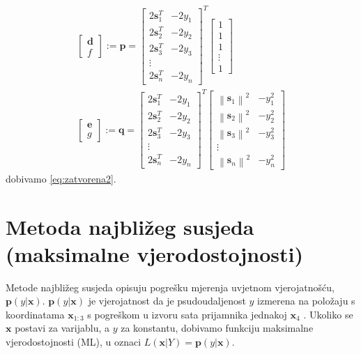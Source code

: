 \documentclass[a4paper,twoside,12pt]{memoir} %
\begin{document}
\begin{align}
	\begin{bmatrix}
	\mathbf{d} \\
	f
	\end{bmatrix}:=
	\mathbf{p} = \begin{bmatrix}
	2\mathbf{s}_1^T & -2y_1\\
	2\mathbf{s}_2^T & -2y_2 \\
	2\mathbf{s}_3^T & -2y_3\\
	\vdots \\
	2\mathbf{s}_n^T & -2y_n
	\end{bmatrix}^T 
	\begin{bmatrix}
	1 \\
	1 \\
	1 \\
	\vdots \\
	1 
	\end{bmatrix} 
	\\ 
	\begin{bmatrix}
	\mathbf{e} \\
	g
	\end{bmatrix}:=
	\mathbf{q} = \begin{bmatrix}
	2\mathbf{s}_1^T & -2y_1\\
	2\mathbf{s}_2^T & -2y_2 \\
	2\mathbf{s}_3^T & -2y_3\\
	\vdots \\
	2\mathbf{s}_n^T & -2y_n
	\end{bmatrix}^T
	\begin{bmatrix}
	\left \| \mathbf{s}_1\right \|^2 & -y_1^2\\
	\left \| \mathbf{s}_2\right \|^2 & -y_2^2\\
	\left \| \mathbf{s}_3\right \|^2 & -y_3^2\\
	\vdots \\
	\left \| \mathbf{s}_n\right \|^2 & -y_n^2
	\end{bmatrix}
\end{align}
dobivamo \ref{eq:zatvorena2}.

\section{Metoda najbližeg susjeda (maksimalne vjerodostojnosti)}\label{sec:MLE}
Metode najbližeg susjeda opisuju pogrešku mjerenja uvjetnom vjerojatnošću,
$\mathbf{p}(y|\mathbf{x})$.
$\mathbf{p}(y|\mathbf{x})$ je vjerojatnost da je psudoudaljenost $y$ izmerena na položaju
s koordinatama $\mathbf{x}_{1:3}$ s pogreškom u izvoru sata prijamnika jednakoj $\mathbf{x}_4$ \cite{math:positioning}.
Ukoliko se $\mathbf{x}$ postavi za varijablu, a $y$ za konstantu, dobivamo
funkciju maksimalne vjerodostojnosti (ML), u oznaci
$L(\mathbf{x}|Y) =\mathbf{p}(y|\mathbf{x})$.
\end{document}
